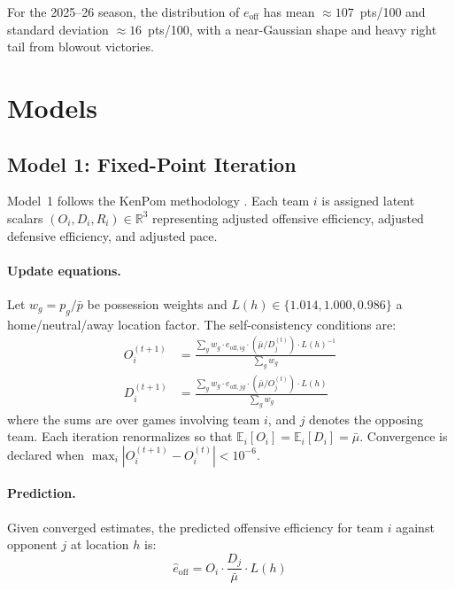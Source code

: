 \documentclass[11pt]{article}
\newcommand{\E}{\mathbb{E}}
\newcommand{\R}{\mathbb{R}}
\begin{document}
For the 2025--26 season, the distribution of $e_{\text{off}}$ has mean
$\approx 107$~pts/100 and standard deviation $\approx 16$~pts/100, with a
near-Gaussian shape and heavy right tail from blowout victories.

\section{Models}

\subsection{Model 1: Fixed-Point Iteration}

Model~1 follows the KenPom methodology \citep{pomeroy2024}.  Each team $i$ is
assigned latent scalars $(O_i, D_i, R_i) \in \R^3$ representing adjusted
offensive efficiency, adjusted defensive efficiency, and adjusted pace.

\paragraph{Update equations.}  Let $w_g = p_g / \bar{p}$ be possession weights
and $L(h) \in \{1.014, 1.000, 0.986\}$ a home/neutral/away location factor.
The self-consistency conditions are:
\begin{align}
  O_i^{(t+1)} &= \frac{\sum_g w_g \cdot e_{\text{off},ig} \cdot (\bar\mu / D_j^{(t)}) \cdot L(h)^{-1}}
                     {\sum_g w_g}
  \label{eq:O_update} \\
  D_i^{(t+1)} &= \frac{\sum_g w_g \cdot e_{\text{off},jg} \cdot (\bar\mu / O_j^{(t)}) \cdot L(h)}
                     {\sum_g w_g}
  \label{eq:D_update}
\end{align}
where the sums are over games involving team $i$, and $j$ denotes the opposing
team.  Each iteration renormalizes so that $\E_i[O_i] = \E_i[D_i] = \bar\mu$.
Convergence is declared when $\max_i |O_i^{(t+1)} - O_i^{(t)}| < 10^{-6}$.

\paragraph{Prediction.}  Given converged estimates, the predicted offensive
efficiency for team $i$ against opponent $j$ at location $h$ is:
\begin{equation}
  \hat{e}_{\text{off}} = O_i \cdot \frac{D_j}{\bar\mu} \cdot L(h)
  \label{eq:m1_predict}
\end{equation}
\end{document}
